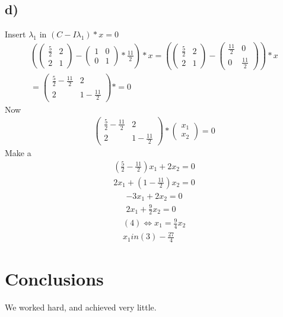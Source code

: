 \documentclass[12pt]{article}
\begin{document}
\subsection{d)}
Insert $\lambda_1$ in $(C - I\lambda_1) * x = 0 $
\begin{gather*}
    \left (
        \begin{pmatrix}
            \frac{5}{2} & 2 \\
            2 & 1 
    \end{pmatrix}
    -
   \begin{pmatrix}
       1 & 0 \\
            0 & 1 
    \end{pmatrix} 
    * \frac{11}{2} \right ) * x = 
    \left (
        \begin{pmatrix}
            \frac{5}{2} & 2 \\
            2 & 1 
    \end{pmatrix}
    -
   \begin{pmatrix}
       \frac{11}{2}  & 0 \\
       0 & \frac{11}{2} 
    \end{pmatrix} 
\right ) * x  \\
= \begin{pmatrix}
            \frac{5}{2} -\frac{11}{2} & 2 \\
            2 & 1 -\frac{11}{2} 
        \end{pmatrix} * = 0 
\end{gather*}
Now 
\begin{gather*}
 \begin{pmatrix}
            \frac{5}{2} -\frac{11}{2} & 2 \\
            2 & 1 -\frac{11}{2} 
        \end{pmatrix}  
        *
        \begin{pmatrix}
            x_1 \\
            x_2
        \end{pmatrix}
        =
        0
\end{gather*}
Make a 
\begin{align}
    (\frac{5}{2} -\frac{11}{2})x_1 + 2x_2 = 0  \\
    2x_1 +(1 -\frac{11}{2})x_2 = 0 
\end{align}
\begin{align}
    -3x_1 + 2x_2 = 0  \\
    2x_1 +\frac{9}{2}x_2 = 0 
\end{align}
\begin{gather*}
    (4) \Leftrightarrow x_1 = \frac{9}{4}x_2 \\
    x_1 in (3) -\frac{27}{4} 
\end{gather*}
\section{Conclusions}\label{conclusions}
We worked hard, and achieved very little.



\end{document}
